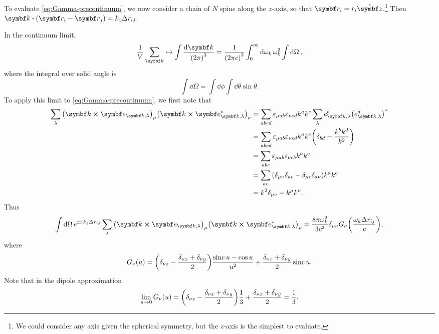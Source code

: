 \documentclass[../thesis.tex]{subfiles}
\begin{document}
To evaluate \cref{eq:Gamma-precontinuum}, we now consider a chain of $N$ spins
along the $z$-axis, so that $\vq{r}_i = r_i \vu{z}$.\footnote{We could consider
any axis given the spherical symmetry, but the $z$-axis is the simplest to
evaluate.} Then $\vq{k} \vdot (\vq{r}_i - \vq{r}_j) = k_z \Delta r_{ij}$.

In the continuum limit,
\begin{equation}
  \frac{1}{V}\sum_{\vq{k}}
  \mapsto
  \int \frac{\dd{\vq{k}}}{{(2\pi)}^3}
  = \frac{1}{{(2\pi c)}^3} \int_0^\infty \dd{\omega_k} \omega_k^2
  \int\dd{\Omega},
  \label{eq:continuum-limit}
\end{equation}
where the integral over solid angle is
\begin{equation}
  \int\dd{\Omega}
  = \int\dd{\phi}\int\dd{\theta}\sin\theta.
  \label{eq:solid-angle}
\end{equation}
To apply this limit to \cref{eq:Gamma-precontinuum}, we first note that
\begin{align}
  \sum_\lambda {\qty(\vq{k} \cross \vq{e}_{\vq{k},\lambda})}_\mu
  {\qty(\vq{k} \cross \vq{e}^*_{\vq{k},\lambda})}_\nu
  &= \sum_{abcd} \varepsilon_{\mu ab}\varepsilon_{\nu cd} k^a k^c 
  \sum_\lambda e_{\vq{k},\lambda}^b {\qty(e_{\vq{k},\lambda}^d)}^*
  \\
  &= \sum_{abcd} \varepsilon_{\mu ab}\varepsilon_{\nu cd} k^a k^c 
  \qty(\delta_{bd} - \frac{k^b k^d}{k^2})
  \\
  &= \sum_{abc} \varepsilon_{\mu ab}\varepsilon_{\nu cb} k^a k^c 
  \\
  &= \sum_{ac} \qty(\delta_{\mu\nu}\delta_{ac} - \delta_{\mu c}\delta_{a\nu}) k^a k^c 
  \\
  &= k^2 \delta_{\mu\nu} - k^\mu k^\nu.
\end{align}
Thus
\begin{equation}
  \int\dd{\Omega} e^{\pm\im k_z \Delta r_{ij}}
  \sum_\lambda {\qty(\vq{k} \cross \vq{e}_{\vq{k},\lambda})}_\mu
  {\qty(\vq{k} \cross \vq{e}^*_{\vq{k},\lambda})}_\nu
  = \frac{8\pi\omega_k^2}{3c^2} \delta_{\mu\nu}
  G_{\nu}\qty(\frac{\omega_k\Delta r_{ij}}{c}),
  \label{eq:angular-integral}
\end{equation}
where
\begin{equation}
  G_{\nu}(u)
  = \qty(\delta_{\nu z} - \frac{\delta_{\nu x} + \delta_{\nu y}}{2})
  \frac{\operatorname{\mathrm{sinc}} u - \cos u}{u^2}
  + \frac{\delta_{\nu x} + \delta_{\nu y}}{2} \operatorname{\mathrm{sinc}} u.
\end{equation}
Note that in the dipole approximation
\begin{equation}
  \lim_{u \to 0} G_\nu(u)
  = \qty(\delta_{\nu z} - \frac{\delta_{\nu x} + \delta_{\nu y}}{2})
  \frac{1}{3}
  + \frac{\delta_{\nu x} + \delta_{\nu y}}{2}
  = \frac{1}{3}.
\end{equation}
\end{document}
